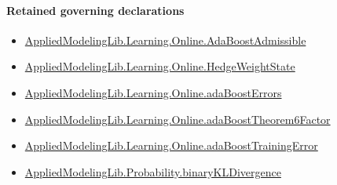 \documentclass[10pt]{article}
\begin{document}
\paragraph{Retained governing declarations}
\begin{itemize}\raggedright
\item \hyperlink{library-prerequisite-2771987b29f636cf}{Applied\allowbreak{}Modeling\allowbreak{}Lib.\allowbreak{}Learning.\allowbreak{}Online.\allowbreak{}Ada\allowbreak{}Boost\allowbreak{}Admissible}
\item \hyperlink{library-prerequisite-8196082d02788389}{Applied\allowbreak{}Modeling\allowbreak{}Lib.\allowbreak{}Learning.\allowbreak{}Online.\allowbreak{}Hedge\allowbreak{}Weight\allowbreak{}State}
\item \hyperlink{library-prerequisite-ff1cefb5582d918e}{Applied\allowbreak{}Modeling\allowbreak{}Lib.\allowbreak{}Learning.\allowbreak{}Online.\allowbreak{}ada\allowbreak{}Boost\allowbreak{}Errors}
\item \hyperlink{library-prerequisite-86f06e91fc897699}{Applied\allowbreak{}Modeling\allowbreak{}Lib.\allowbreak{}Learning.\allowbreak{}Online.\allowbreak{}ada\allowbreak{}Boost\allowbreak{}Theorem6\allowbreak{}Factor}
\item \hyperlink{governing-declaration-0e5e303d5e8eab7c}{Applied\allowbreak{}Modeling\allowbreak{}Lib.\allowbreak{}Learning.\allowbreak{}Online.\allowbreak{}ada\allowbreak{}Boost\allowbreak{}Training\allowbreak{}Error}
\item \hyperlink{governing-declaration-b1fa8a0b7a6c91ad}{Applied\allowbreak{}Modeling\allowbreak{}Lib.\allowbreak{}Probability.\allowbreak{}binary\allowbreak{}KL\allowbreak{}Divergence}
\end{itemize}
\end{document}
